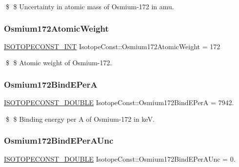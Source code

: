 \$ \$ Uncertainty in atomic mass of Osmium-\/172 in amu. \mbox{\label{group___isotope_const-_osmium-_os172_ga369a8a8b37d947ae9ab9cb286583839e}} 
\subsubsection{\texorpdfstring{Osmium172\+Atomic\+Weight}{Osmium172AtomicWeight}}
{\footnotesize\ttfamily \mbox{\hyperlink{group___isotope_const-_macros_ga5f18360b3e99483a35c32d789e62621c}{I\+S\+O\+T\+O\+P\+E\+C\+O\+N\+S\+T\+\_\+\+I\+NT}} Isotope\+Const\+::\+Osmium172\+Atomic\+Weight = 172}

\$ \$ Atomic weight of Osmium-\/172. \mbox{\label{group___isotope_const-_osmium-_os172_ga5547b88e3f58c922e01306ac568c1b73}} 
\subsubsection{\texorpdfstring{Osmium172\+Bind\+E\+PerA}{Osmium172BindEPerA}}
{\footnotesize\ttfamily \mbox{\hyperlink{group___isotope_const-_macros_ga8f45a7272ce02c0b4c65c44636ed719a}{I\+S\+O\+T\+O\+P\+E\+C\+O\+N\+S\+T\+\_\+\+D\+O\+U\+B\+LE}} Isotope\+Const\+::\+Osmium172\+Bind\+E\+PerA = 7942.}

\$ \$ Binding energy per A of Osmium-\/172 in keV. \mbox{\label{group___isotope_const-_osmium-_os172_ga84b7f563babc7db775189a444dbc7159}} 
\subsubsection{\texorpdfstring{Osmium172\+Bind\+E\+Per\+A\+Unc}{Osmium172BindEPerAUnc}}
{\footnotesize\ttfamily \mbox{\hyperlink{group___isotope_const-_macros_ga8f45a7272ce02c0b4c65c44636ed719a}{I\+S\+O\+T\+O\+P\+E\+C\+O\+N\+S\+T\+\_\+\+D\+O\+U\+B\+LE}} Isotope\+Const\+::\+Osmium172\+Bind\+E\+Per\+A\+Unc = 0.}

